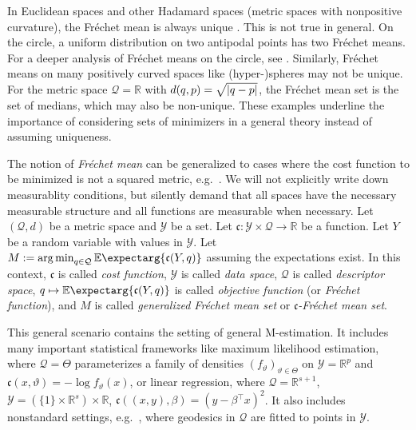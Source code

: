 \documentclass{scrartcl}
\newcommand{\Ex}{\E\expectarg}
\newcommand*{\mc}[1]{\mathcal{#1}}
\newcommand*{\mf}[1]{\mathfrak{#1}}
\newcommand{\R}{\mathbb{R}}
\newcommand{\transpose}{\!^\top\!}
\newcommand{\tr}{\transpose}
\DeclareMathOperator*{\argmin}{arg\,min}
\theoremstyle{plain}\newtheorem{theorem}{Theorem}[section]
\theoremstyle{definition}
\theoremstyle{remark}
\begin{document}
In Euclidean spaces and other Hadamard spaces (metric spaces with nonpositive curvature), the Fréchet mean is always unique \cite[Proposition 4.3]{sturm03}. This is not true in general. On the circle, a uniform distribution on two antipodal points has two Fréchet means. For a deeper analysis of Fréchet means on the circle, see \cite{hotz15}. Similarly, Fréchet means on many positively curved spaces like (hyper-)spheres may not be unique. For the metric space $\mc Q = \R$ with $d(q,p) =\sqrt{\left| q-p \right|}$, the Fréchet mean set is the set of medians, which may also be non-unique. These examples underline the importance of considering sets of minimizers in a general theory instead of assuming uniqueness.

The notion of \textit{Fréchet mean} can be generalized to cases where the cost function to be minimized is not a squared metric, e.g.\ \cite{huckemann11}. We will not explicitly write down measurablity conditions, but silently demand that all spaces have the necessary measurable structure and all functions are measurable when necessary. Let $(\mc Q, d)$ be a metric space and $\mc Y$ be a set. Let $\mf c \colon \mc Y \times \mc Q \to \R$ be a function. Let $Y$ be a random variable with values in $\mc Y$. Let $M := \argmin_{q\in\mc Q} \Ex{\mf c(Y, q)}$ assuming the expectations exist. 
In this context, $\mf c$ is called \textit{cost function}, $\mc Y$ is called \textit{data space}, $\mc Q$ is called \textit{descriptor space}, $q\mapsto\Ex{\mf c(Y, q)}$ is called \textit{objective function} (or \textit{Fréchet function}), and $M$ is called \textit{generalized Fréchet mean set} or \textit{$\mf c$-Fréchet mean set}. 

This general scenario contains the setting of general M-estimation. It includes many important statistical frameworks like maximum likelihood estimation, where $\mc Q = \Theta$ parameterizes a family of densities $(f_\vartheta)_{\vartheta\in\Theta}$ on $\mc Y = \R^p$ and $\mf c(x,\vartheta) = -\log f_{\vartheta}(x)$, or linear regression, where $\mc Q = \R^{s+1}$, $\mc Y = (\{1\}\times\R^s) \times \R$, $\mf c((x,y),\beta) = (y - \beta\tr x)^2$. It also includes nonstandard settings, e.g.\ \cite{huckemann11}, where geodesics in $\mc Q$ are fitted to points in $\mc Y$.
\end{document}
